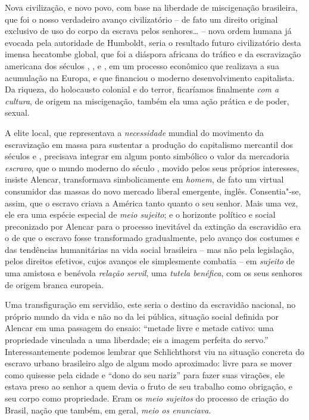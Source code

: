 Nova civilização, e novo povo, com base na liberdade de miscigenação
brasileira, que foi o nosso verdadeiro avanço civilizatório -- de fato
um direito original exclusivo de uso do corpo da escrava pelos
senhores\ldots{} -- nova ordem humana já evocada pela autoridade de Humboldt,
seria o resultado futuro civilizatório desta imensa hecatombe global,
que foi a diáspora africana do tráfico e da escravização americana dos
séculos , ,  e , em um processo econômico que realizava a
sua acumulação na Europa, e que financiou o moderno desenvolvimento
capitalista. Da riqueza, do holocausto colonial e do terror, ficaríamos
finalmente \emph{com a cultura}, de origem na miscigenação, também ela
uma ação prática e de poder, sexual.

A elite local, que representava a \emph{necessidade} mundial do
movimento da escravização em massa para sustentar a produção do
capitalismo mercantil dos séculos  e , precisava integrar em
algum ponto simbólico o valor da mercadoria \emph{escravo}, que o mundo
moderno do século , movido pelos seus próprios interesses, insiste
Alencar, transformava simbolicamente em \emph{homem}, de fato um virtual
consumidor das massas do novo mercado liberal emergente, inglês.
Consentia"-se, assim, que o escravo criava a América tanto quanto o seu
senhor. Mais uma vez, ele era uma espécie especial de \emph{meio
sujeito}; e o horizonte político e social preconizado por Alencar para o
processo inevitável da extinção da escravidão era o de que o escravo
fosse transformado gradualmente, pelo avanço dos costumes e das
tendências humanitárias na vida social brasileira -- mas não pela
legislação, pelos direitos efetivos, cujos avanços ele simplesmente
combatia -- em \emph{sujeito} de uma amistosa e benévola \emph{relação
servil}, uma \emph{tutela benéfica}, com os seus senhores de origem
branca europeia.

Uma transfiguração em servidão, este seria o destino da escravidão
nacional, no próprio mundo da vida e não no da lei pública, situação
social definida por Alencar em uma passagem do ensaio: ``metade livre e
metade cativo: uma propriedade vinculada a uma liberdade; eis a imagem
perfeita do servo.'' Interessantemente podemos lembrar que Schlichthorst
viu na situação concreta do escravo urbano brasileiro algo de algum modo
aproximado: livre para se mover como quisesse pela cidade e ``dono do
seu nariz'' para fazer suas virações, ele estava preso ao senhor a quem
devia o fruto de seu trabalho como obrigação, e seu corpo como
propriedade. Eram os \emph{meio sujeitos} do processo de criação do
Brasil, nação que também, em geral, \emph{meio os enunciava}.

